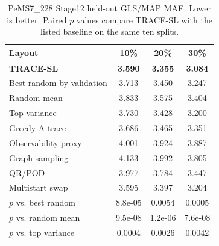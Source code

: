 \begin{table}[pos=htbp]
\centering
\caption{PeMS7\_228 Stage12 held-out GLS/MAP MAE. Lower is better. Paired $p$ values compare TRACE-SL with the listed baseline on the same ten splits.}
\label{tab:main-results}
\small
\begin{tabular}{lccc}
\toprule
Layout & 10\% & 20\% & 30\% \\
\midrule
\textbf{TRACE-SL} & \textbf{3.590} & \textbf{3.355} & \textbf{3.084} \\
Best random by validation & 3.713 & 3.450 & 3.247 \\
Random mean & 3.833 & 3.575 & 3.404 \\
Top variance & 3.730 & 3.428 & 3.200 \\
Greedy A-trace & 3.686 & 3.465 & 3.351 \\
Observability proxy & 4.001 & 3.924 & 3.887 \\
Graph sampling & 4.133 & 3.992 & 3.805 \\
QR/POD & 3.977 & 3.784 & 3.447 \\
Multistart swap & 3.595 & 3.397 & 3.204 \\
\midrule
$p$ vs. best random & 8.8e-05 & 0.0054 & 0.0005 \\
$p$ vs. random mean & 9.5e-08 & 1.2e-06 & 7.6e-08 \\
$p$ vs. top variance & 0.0004 & 0.0026 & 0.0042 \\
\bottomrule
\end{tabular}
\end{table}
